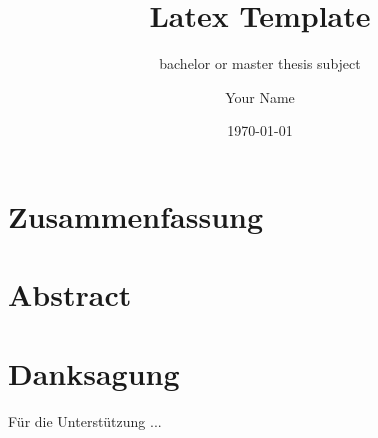 \documentclass[
	12pt %
	,a4paper %
	,headings=normal %
	,toc=graduated %
]{scrreprt} %
\author{Your Name}
\title{Latex Template}
\subtitle{bachelor or master thesis subject}
\date{\today}
\begin{document}
\renewcommand{\thesection}{\Roman{section}} \renewcommand{\theHsection}{\Roman{section}}


\maketitle


\section*{Zusammenfassung} %
\blindtext

\section*{Abstract}
\blindtext
{}

\newpage


\section*{Danksagung}

Für die Unterstützung ...\par


\tableofcontents

\newpage
\onehalfspacing %
\renewcommand{\thesection}{\arabic{section}}
\renewcommand{\theHsection}{\arabic{section}}
\setcounter{section}{0}
\setcounter{page}{1}

\end{document}
